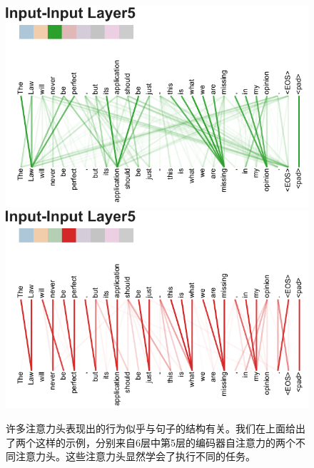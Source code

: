 \documentclass[lang=cn,a4paper,newtx]{elegantpaper}
\begin{document}
\begin{figure}
{\includegraphics[width=\textwidth, trim=0 0 0 36, clip]{./vis/attending_to_head_new.pdf}}
{\includegraphics[width=\textwidth, trim=0 0 0 36, clip]{./vis/attending_to_head2_new.pdf}}
\caption{许多注意力头表现出的行为似乎与句子的结构有关。我们在上面给出了两个这样的示例，分别来自6层中第5层的编码器自注意力的两个不同注意力头。这些注意力头显然学会了执行不同的任务。}
\end{figure}
\end{document}
